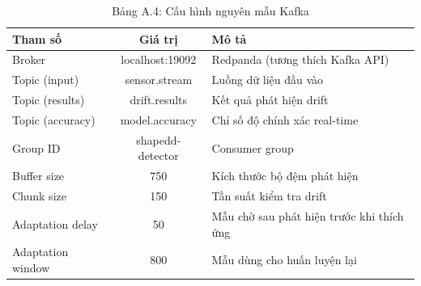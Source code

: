 \begin{table}[H]
	\centering
	\caption*{Bảng A.4: Cấu hình nguyên mẫu Kafka}
	\begin{tabular}{|l|c|p{7cm}|}
		\hline
		\textbf{Tham số} & \textbf{Giá trị} & \textbf{Mô tả} \\
		\hline
		Broker & localhost:19092 & Redpanda (tương thích Kafka API) \\
		Topic (input) & sensor.stream & Luồng dữ liệu đầu vào \\
		Topic (results) & drift.results & Kết quả phát hiện drift \\
		Topic (accuracy) & model.accuracy & Chỉ số độ chính xác real-time \\
		Group ID & shapedd-detector & Consumer group \\
		Buffer size & 750 & Kích thước bộ đệm phát hiện \\
		Chunk size & 150 & Tần suất kiểm tra drift \\
		Adaptation delay & 50 & Mẫu chờ sau phát hiện trước khi thích ứng \\
		Adaptation window & 800 & Mẫu dùng cho huấn luyện lại \\
		\hline
	\end{tabular}
\end{table}
